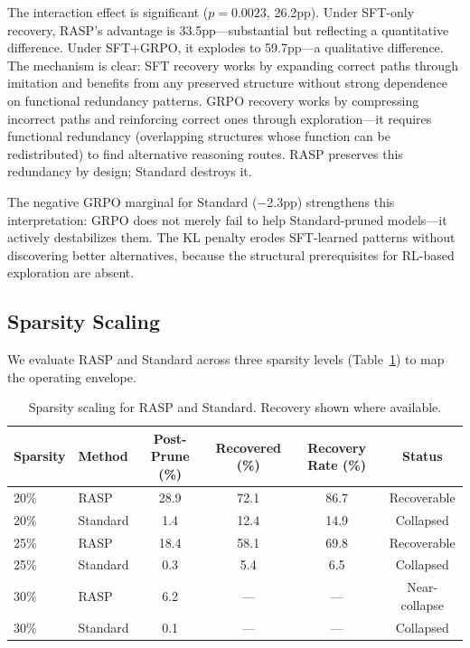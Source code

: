 \documentclass[11pt]{article}
\begin{document}
The interaction effect is significant ($p = 0.0023$, 26.2pp).
Under SFT-only recovery, RASP's advantage is 33.5pp---substantial but reflecting a quantitative difference.
Under SFT+GRPO, it explodes to 59.7pp---a qualitative difference.
The mechanism is clear: SFT recovery works by expanding correct paths through imitation and benefits from any preserved structure without strong dependence on functional redundancy patterns.
GRPO recovery works by compressing incorrect paths and reinforcing correct ones through exploration---it requires functional redundancy (overlapping structures whose function can be redistributed) to find alternative reasoning routes.
RASP preserves this redundancy by design; Standard destroys it.

The negative GRPO marginal for Standard ($-$2.3pp) strengthens this interpretation: GRPO does not merely fail to help Standard-pruned models---it actively destabilizes them.
The KL penalty erodes SFT-learned patterns without discovering better alternatives, because the structural prerequisites for RL-based exploration are absent.


\subsection{Sparsity Scaling}
\label{sec:sparsity}

We evaluate RASP and Standard across three sparsity levels (Table~\ref{tab:sparsity}) to map the operating envelope.

\begin{table}[t]
\centering
\caption{Sparsity scaling for RASP and Standard. Recovery shown where available.}
\label{tab:sparsity}
\begin{tabular}{llcccc}
\toprule
\textbf{Sparsity} & \textbf{Method} & \textbf{Post-Prune (\%)} & \textbf{Recovered (\%)} & \textbf{Recovery Rate (\%)} & \textbf{Status} \\
\midrule
20\% & RASP     & 28.9 & 72.1 & 86.7 & Recoverable \\
20\% & Standard & 1.4  & 12.4 & 14.9 & Collapsed \\
\midrule
25\% & RASP     & 18.4 & 58.1 & 69.8 & Recoverable \\
25\% & Standard & 0.3  & 5.4  & 6.5  & Collapsed \\
\midrule
30\% & RASP     & 6.2  & ---  & ---  & Near-collapse \\
30\% & Standard & 0.1  & ---  & ---  & Collapsed \\
\bottomrule
\end{tabular}
\end{table}
\end{document}

